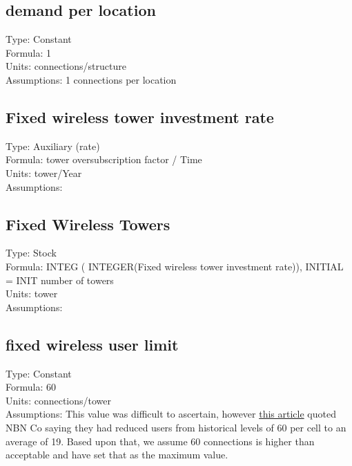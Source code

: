 \documentclass[
  11pt,
]{book}
\begin{document}
\hypertarget{demand-per-location}{%
\subsection{demand per location}\label{demand-per-location}}

Type: Constant\\
Formula: 1\\
Units: connections/structure\\
Assumptions: 1 connections per location

\hypertarget{fixed-wireless-tower-investment-rate}{%
\subsection{Fixed wireless tower investment rate}\label{fixed-wireless-tower-investment-rate}}

Type: Auxiliary (rate)\\
Formula: tower oversubscription factor / Time\\
Units: tower/Year\\
Assumptions:

\hypertarget{fixed-wireless-towers}{%
\subsection{Fixed Wireless Towers}\label{fixed-wireless-towers}}

Type: Stock\\
Formula: INTEG ( INTEGER(Fixed wireless tower investment rate)), INITIAL = INIT number of towers\\
Units: tower\\
Assumptions:

\hypertarget{fixed-wireless-user-limit}{%
\subsection{fixed wireless user limit}\label{fixed-wireless-user-limit}}

Type: Constant\\
Formula: 60\\
Units: connections/tower\\
Assumptions: This value was difficult to ascertain, however \href{https://www.itnews.com.au/news/nbn-co-cuts-average-number-of-users-per-wireless-cell-to-19-559707}{this article} quoted NBN Co saying they had reduced users from historical levels of 60 per cell to an average of 19. Based upon that, we assume 60 connections is higher than acceptable and have set that as the maximum value.
\end{document}
